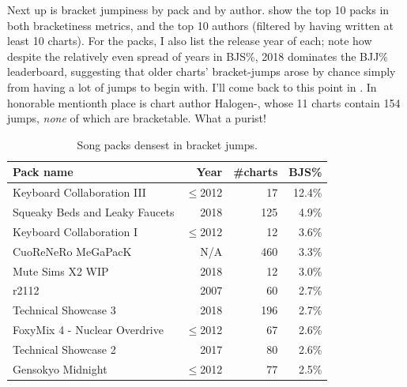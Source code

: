 \documentclass[10pt]{sigplanconf}
\begin{document}
Next up is bracket jumpiness by pack and by author.
 show the top 10 packs in both bracketiness metrics,
and  the top 10 authors
(filtered by having written at least 10 charts).
For the packs, I also list the release year of each;
note how despite the relatively even spread of years in BJS\%,
2018 dominates the BJJ\% leaderboard,
suggesting that older charts' bracket-jumps arose by chance simply from having a lot of jumps to begin with.
I'll come back to this point in .
In honorable mentionth place is chart author Halogen-, whose 11 charts contain 154 jumps, \textit{none} of which are bracketable.
What a purist!

\begin{table}[t]
	\begin{center}
		\small
	\begin{tabular}{l|r|r|r}
		\bf Pack name & \bf Year & \bf \#charts & \bf BJS\% \\
		\hline
		Keyboard Collaboration III		& $\le$2012	&  17 & 12.4\% \\
		Squeaky Beds and Leaky Faucets		& 2018	& 125 &  4.9\% \\
		Keyboard Collaboration I		& $\le$2012	&  12 &  3.6\% \\
		CuoReNeRo MeGaPacK			& N/A	& 460 &  3.3\% \\
		Mute Sims X2 WIP			& 2018	&  12 &  3.0\% \\
		r2112					& 2007	&  60 &  2.7\% \\
		Technical Showcase 3			& 2018	& 196 &  2.7\% \\
		FoxyMix 4 - Nuclear Overdrive		& $\le$2012	&  67 &  2.6\% \\
		Technical Showcase 2			& 2017	&  80 &  2.6\% \\
		Gensokyo Midnight			& $\le$2012 	&  77 &  2.5\% \\
	\end{tabular}
	\end{center}
	\caption{Song packs densest in bracket jumps.}
	\label{tab:pack-bjs}
\end{table}
\end{document}
